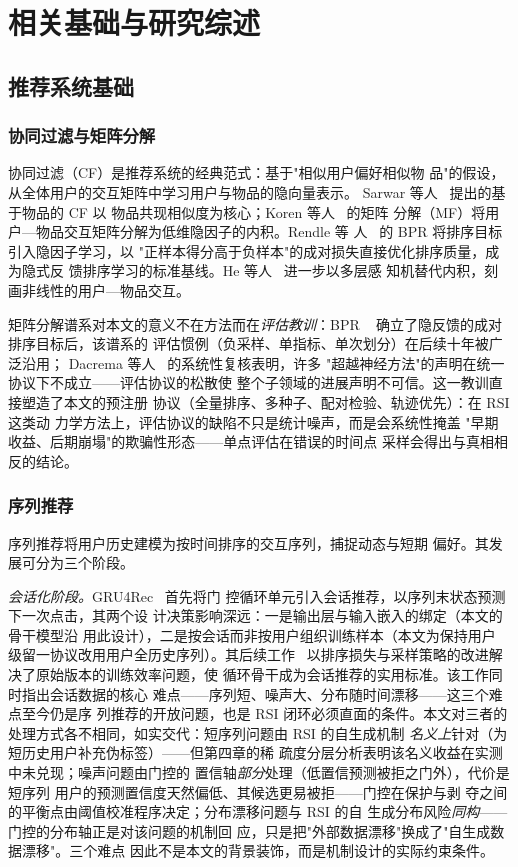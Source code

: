 \chapter{相关基础与研究综述}\label{ch:related}

\section{推荐系统基础}
\subsection{协同过滤与矩阵分解}
协同过滤（CF）是推荐系统的经典范式：基于"相似用户偏好相似物
品"的假设，从全体用户的交互矩阵中学习用户与物品的隐向量表示。
Sarwar 等人~\cite{sarwar2001itembased} 提出的基于物品的 CF 以
物品共现相似度为核心；Koren 等人~\cite{koren2009matrix} 的矩阵
分解（MF）将用户—物品交互矩阵分解为低维隐因子的内积。Rendle 等
人~\cite{rendle2009bpr} 的 BPR 将排序目标引入隐因子学习，以
"正样本得分高于负样本"的成对损失直接优化排序质量，成为隐式反
馈排序学习的标准基线。He 等人~\cite{he2017ncf} 进一步以多层感
知机替代内积，刻画非线性的用户—物品交互。

矩阵分解谱系对本文的意义不在方法而在\emph{评估教训}：BPR
~\cite{rendle2009bpr} 确立了隐反馈的成对排序目标后，该谱系的
评估惯例（负采样、单指标、单次划分）在后续十年被广泛沿用；
Dacrema 等人~\cite{dacrema2019worrying} 的系统性复核表明，许多
"超越神经方法"的声明在统一协议下不成立——评估协议的松散使
整个子领域的进展声明不可信。这一教训直接塑造了本文的预注册
协议（全量排序、多种子、配对检验、轨迹优先）：在 RSI 这类动
力学方法上，评估协议的缺陷不只是统计噪声，而是会系统性掩盖
"早期收益、后期崩塌"的欺骗性形态——单点评估在错误的时间点
采样会得出与真相相反的结论。

\subsection{序列推荐}
序列推荐将用户历史建模为按时间排序的交互序列，捕捉动态与短期
偏好。其发展可分为三个阶段。

\emph{会话化阶段。}GRU4Rec~\cite{hidasi2016gru4rec} 首先将门
控循环单元引入会话推荐，以序列末状态预测下一次点击，其两个设
计决策影响深远：一是输出层与输入嵌入的绑定（本文的骨干模型沿
用此设计），二是按会话而非按用户组织训练样本（本文为保持用户
级留一协议改用用户全历史序列）。其后续工作~\cite{hidasi2018recurrent}
以排序损失与采样策略的改进解决了原始版本的训练效率问题，使
循环骨干成为会话推荐的实用标准。该工作同时指出会话数据的核心
难点——序列短、噪声大、分布随时间漂移——这三个难点至今仍是序
列推荐的开放问题，也是 RSI 闭环必须直面的条件。本文对三者的
处理方式各不相同，如实交代：短序列问题由 RSI 的自生成机制
\emph{名义上}针对（为短历史用户补充伪标签）——但第四章的稀
疏度分层分析表明该名义收益在实测中未兑现；噪声问题由门控的
置信轴\emph{部分}处理（低置信预测被拒之门外），代价是短序列
用户的预测置信度天然偏低、其候选更易被拒——门控在保护与剥
夺之间的平衡点由阈值校准程序决定；分布漂移问题与 RSI 的自
生成分布风险\emph{同构}——门控的分布轴正是对该问题的机制回
应，只是把"外部数据漂移"换成了"自生成数据漂移"。三个难点
因此不是本文的背景装饰，而是机制设计的实际约束条件。

